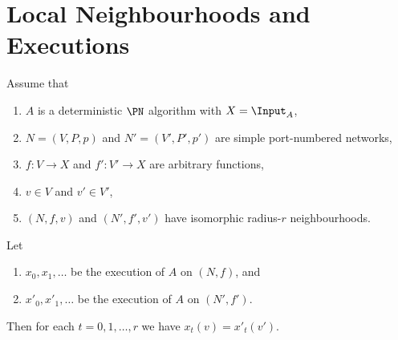 \section{Local Neighbourhoods and Executions}

\begin{theorem}\label{thm:local-neighbourhood}
    Assume that
    \begin{enumerate}[itemsep=0ex]\raggedright
        \item $A$ is a deterministic $\PN$ algorithm with $X = \Input_A$,
        \item $N = (V,P,p)$ and $N' = (V'\!,P'\!,p')$ are simple port-numbered networks,
        \item $f\colon V \to X$ and $f'\colon V' \to X$ are arbitrary functions,
        \item $v \in V$ and $v' \in V'$,
        \item $(N,f,v)$ and $(N'\!,f'\!,v')$ have isomorphic radius-$r$ neighbourhoods.
    \end{enumerate}
    Let
    \begin{enumerate}[resume*]
        \item $x_0, x_1, \dotsc$ be the execution of $A$ on $(N,f)$, and
        \item $x'_0, x'_1, \dotsc$ be the execution of $A$ on $(N'\!,f')$.
    \end{enumerate}
    Then for each $t = 0, 1, \dotsc, r$ we have $x_t(v) = x'_t(v')$.
\end{theorem}

